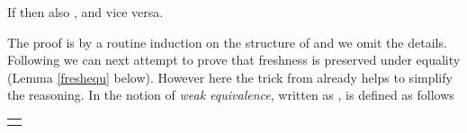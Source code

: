 \begin{isabellebody}
\begin{isamarkuptext}
  \begin{lemma}\label{fresheqvt}
  If  then also , and vice versa.
  \end{lemma}

  \noindent
  The proof is by a routine induction on the structure of  and we omit the details. 
  Following \cite{UrbanPittsGabbay04}
  we can next attempt to prove that freshness is preserved under equality (Lemma \ref{freshequ} below). 
  However here the trick from \cite{KumarNorrish10} already helps to simplify the reasoning. In 
  \cite{KumarNorrish10} the notion of \emph{weak equivalence}, 
  written as , is defined as follows

  \begin{center}
  \begin{tabular}{c}
  \isa{\mbox{}\inferrule{\mbox{}}{\mbox{{\isaliteral{5C3C6C616E676C653E}{\isasymlangle}}{\isaliteral{5C3C72616E676C653E}{\isasymrangle}}\ {\isaliteral{5C3C73696D3E}{\isasymsim}}\ {\isaliteral{5C3C6C616E676C653E}{\isasymlangle}}{\isaliteral{5C3C72616E676C653E}{\isasymrangle}}}}}\hspace{5mm}
  \isa{\mbox{}\inferrule{\mbox{}}{\mbox{a\ {\isaliteral{5C3C73696D3E}{\isasymsim}}\ a}}}\hspace{5mm}
  \isa{\mbox{}\inferrule{\mbox{t\ {\isaliteral{5C3C73696D3E}{\isasymsim}}\ t{\isaliteral{27}{\isacharprime}}}}{\mbox{f\ t\ {\isaliteral{5C3C73696D3E}{\isasymsim}}\ f\ t{\isaliteral{27}{\isacharprime}}}}}\medskip\\
  

\end{tabular}
\end{center}
\end{isamarkuptext}
\end{isabellebody}
